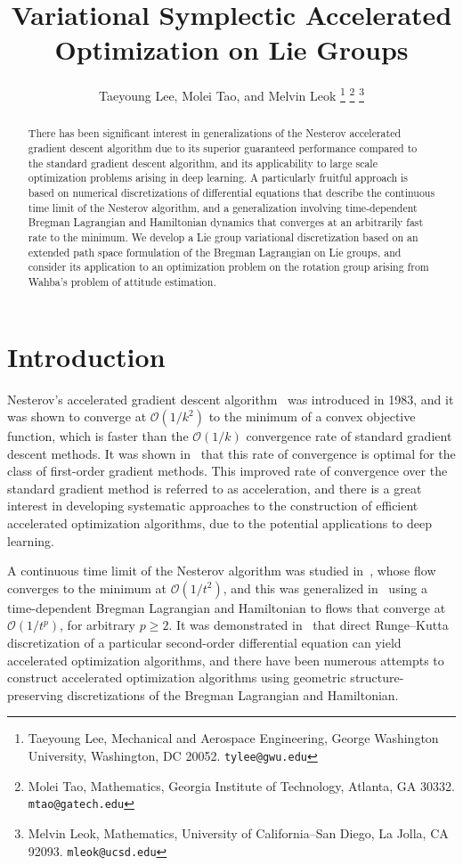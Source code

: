 \documentclass[letterpaper, 10pt, conference]{ieeeconf}
\title{\LARGE \bf Variational Symplectic Accelerated Optimization on Lie Groups}
\author{%
    Taeyoung Lee, Molei Tao, and Melvin Leok%
    \thanks{Taeyoung Lee, Mechanical and Aerospace Engineering, George Washington University, Washington, DC 20052. {\tt tylee@gwu.edu}}%
    \thanks{Molei Tao, Mathematics, Georgia Institute of Technology, Atlanta, GA 30332. {\tt mtao@gatech.edu}}
    \thanks{Melvin Leok, Mathematics, University of California--San Diego, La Jolla, CA 92093. {\tt mleok@ucsd.edu}}
}
\begin{document}
\allowdisplaybreaks

\maketitle \thispagestyle{empty} \pagestyle{empty}

\begin{abstract}
There has been significant interest in generalizations of the Nesterov accelerated gradient descent algorithm due to its superior guaranteed performance compared to the standard gradient descent algorithm, and its applicability to large scale optimization problems arising in deep learning.
A particularly fruitful approach is based on numerical discretizations of differential equations that describe the continuous time limit of the Nesterov algorithm, and a generalization involving time-dependent Bregman Lagrangian and Hamiltonian dynamics that converges at an arbitrarily fast rate to the minimum.
We develop a Lie group variational discretization based on an extended path space formulation of the Bregman Lagrangian on Lie groups, and consider its application to an optimization problem on the rotation group arising from Wahba's problem of attitude estimation.
\end{abstract}

\section{Introduction}

Nesterov's accelerated gradient descent algorithm~\cite{Nes83} was  introduced in 1983, and it was shown to converge at $\mathcal{O}(1/k^2)$ to the minimum of a convex objective function, which is faster than the $\mathcal{O}(1/k)$ convergence rate of standard gradient descent methods.
It was shown in~\cite{nesterov2003introductory} that this rate of convergence is optimal for the class of first-order gradient methods.
This improved rate of convergence over the standard gradient method is referred to as acceleration, and there is a great interest in developing systematic approaches to the construction of efficient accelerated optimization algorithms, due to the potential applications to deep learning.

A continuous time limit of the Nesterov algorithm was studied in~\cite{su2016differential}, whose flow converges to the minimum at $\mathcal{O}(1/t^2)$, and this was generalized in~\cite{wibisono2016variational} using a time-dependent Bregman Lagrangian and Hamiltonian to flows that converge at $\mathcal{O}(1/t^p)$, for arbitrary $p\geq 2$.
It was demonstrated in~\cite{ZhMoSrJa2018} that direct Runge--Kutta discretization of a particular second-order differential equation can yield accelerated optimization algorithms, and there have been numerous attempts to construct accelerated optimization algorithms using geometric structure-preserving discretizations of the Bregman Lagrangian and Hamiltonian.
\end{document}
